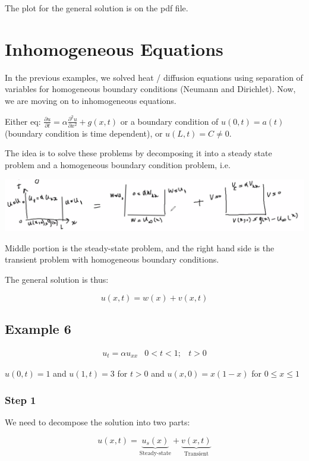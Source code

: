 \documentclass{article}
\begin{document}
The plot for the general solution is on the pdf file. 

\section{Inhomogeneous Equations}

In the previous examples, we solved heat / diffusion equations using separation of variables for homogeneous boundary conditions (Neumann and Dirichlet). Now, we are moving on to inhomogeneous equations. 

Either eq: $\frac{\partial u}{\partial t} = \alpha \frac{\partial^2 u}{\partial x^2} + g(x,t)$ or a boundary condition of $u(0,t) = a(t)$ (boundary condition is time dependent), or $u(L,t) = C \neq 0$. 

The idea is to solve these problems by decomposing it into a steady state problem and a homogeneous boundary condition problem, i.e. 

\includegraphics[width = 0.95 \textwidth]{image2.png}

Middle portion is the steady-state problem, and the right hand side is the transient problem with homogeneous boundary conditions. 

The general solution is thus:

$$u(x,t) = w(x) + v(x,t)$$

\subsection{Example 6}

$$\begin{matrix} u_t = \alpha u_{xx} & 0 < t < 1; & t > 0 \end{matrix}$$

$u(0,t) = 1$ and $u(1,t) = 3$ for $t > 0$ and $u(x,0) = x(1-x)$ for $0 \leq x \leq 1$

\subsubsection{Step 1}

We need to decompose the solution into two parts:

$$u(x,t) = \underbrace{u_s (x)}_{\text{Steady-state}} + \underbrace{v(x,t)}_{\text{Transient}}$$
\end{document}

